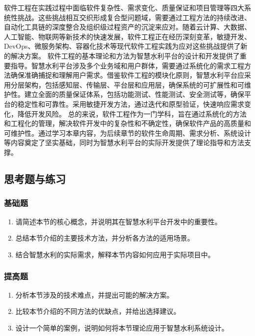 软件工程在实践过程中面临软件复杂性、需求变化、质量保证和项目管理等四大系统性挑战。这些挑战相互交织形成复合型问题域，需要通过工程方法的持续改进、自动化工具链的深度整合及组织级过程资产的沉淀来应对。随着云计算、大数据、人工智能、物联网等新技术的快速发展，软件工程正在经历深刻变革，敏捷开发、DevOps、微服务架构、容器化技术等现代软件工程实践为应对这些挑战提供了新的解决方案。
软件工程的基本理论和方法为智慧水利平台的设计和开发提供了重要指导。智慧水利平台涉及多个业务域和用户群体，需要通过系统化的需求工程方法确保准确捕捉和理解用户需求。借鉴软件工程的模块化原则，智慧水利平台应采用分层架构，包括感知层、传输层、平台层和应用层，确保系统的可扩展性和可维护性。建立全面的质量保证体系，包括功能测试、性能测试、安全测试等，确保平台的稳定性和可靠性。采用敏捷开发方法，通过迭代和原型验证，快速响应需求变化，降低开发风险。
总的来说，软件工程作为一门学科，旨在通过系统化的方法和工程化的管理，解决软件开发中的复杂性和不确定性，确保软件产品的高质量和可维护性。通过学习本章内容，为后续章节的软件生命周期、需求分析、系统设计等内容奠定了坚实基础，同时为智慧水利平台的实际开发提供了理论指导和方法支撑。
\subsection{思考题与练习}\label{ux601dux8003ux9898ux4e0eux7ec3ux4e60-2} \subsubsection{基础题}\label{ux57faux7840ux9898-2}
\begin{enumerate} \def\labelenumi{\arabic{enumi}.} \tightlist \item 请简述本节的核心概念，并说明其在智慧水利平台开发中的重要性。 \item
总结本节介绍的主要技术方法，并分析各方法的适用场景。 \item 结合智慧水利的实际需求，解释本节内容如何应用于实际项目中。 \end{enumerate}
\subsubsection{提高题}\label{ux63d0ux9ad8ux9898-2} \begin{enumerate} \def\labelenumi{\arabic{enumi}.} \tightlist \item
分析本节涉及的技术难点，并提出可能的解决方案。 \item 比较本节介绍的不同方法的优缺点，并给出选择建议。 \item 设计一个简单的案例，说明如何将本节理论应用于智慧水利系统设计。 \end{enumerate}
